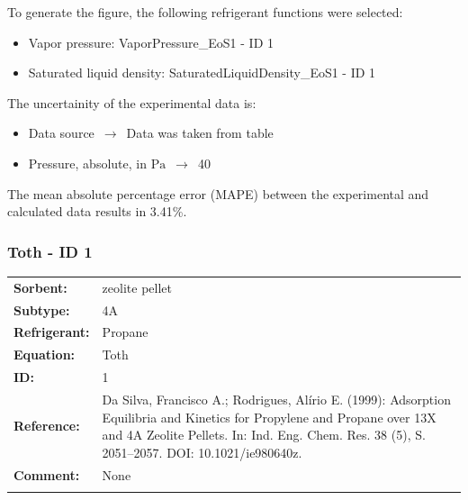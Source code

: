 To generate the figure, the following refrigerant functions were selected:
\begin{itemize}
\item Vapor pressure: VaporPressure\_EoS1 - ID 1
\item Saturated liquid density: SaturatedLiquidDensity\_EoS1 - ID 1
\end{itemize}

The uncertainity of the experimental data is:
\begin{itemize}
\item Data source $\,\to\,$ Data was taken from table
\item Pressure, absolute, in $\si{\pascal}$ $\,\to\,$ 40
\end{itemize}

The mean absolute percentage error (MAPE) between the experimental and calculated data results in 3.41\%.
\FloatBarrier
\newpage
\subsubsection{Toth - ID 1}
%
\begin{tabular}[l]{|lp{11.5cm}|}
\hline
\addlinespace

\textbf{Sorbent:} & zeolite pellet \\
\textbf{Subtype:} & 4A \\
\textbf{Refrigerant:} & Propane \\
\textbf{Equation:} & Toth \\
\textbf{ID:} & 1 \\
\textbf{Reference:} & Da Silva, Francisco A.; Rodrigues, Alírio E. (1999): Adsorption Equilibria and Kinetics for Propylene and Propane over 13X and 4A Zeolite Pellets. In: Ind. Eng. Chem. Res. 38 (5), S. 2051–2057. DOI: 10.1021/ie980640z. \\
\textbf{Comment:} & None \\

\addlinespace
\hline
\end{tabular}
\newline

